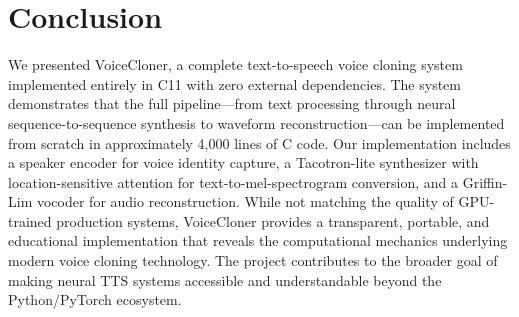 \documentclass[conference]{IEEEtran}
\begin{document}
\section{Conclusion}

We presented VoiceCloner, a complete text-to-speech voice cloning system implemented entirely in C11 with zero external dependencies. The system demonstrates that the full pipeline—from text processing through neural sequence-to-sequence synthesis to waveform reconstruction—can be implemented from scratch in approximately 4,000 lines of C code. Our implementation includes a speaker encoder for voice identity capture, a Tacotron-lite synthesizer with location-sensitive attention for text-to-mel-spectrogram conversion, and a Griffin-Lim vocoder for audio reconstruction. While not matching the quality of GPU-trained production systems, VoiceCloner provides a transparent, portable, and educational implementation that reveals the computational mechanics underlying modern voice cloning technology. The project contributes to the broader goal of making neural TTS systems accessible and understandable beyond the Python/PyTorch ecosystem.



\end{document}
